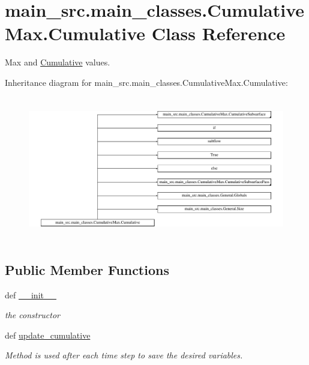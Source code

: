 \hypertarget{classmain__src_1_1main__classes_1_1CumulativeMax_1_1Cumulative}{\section{main\-\_\-src.\-main\-\_\-classes.\-Cumulative\-Max.\-Cumulative Class Reference}
\label{classmain__src_1_1main__classes_1_1CumulativeMax_1_1Cumulative}
}


Max and \hyperlink{classmain__src_1_1main__classes_1_1CumulativeMax_1_1Cumulative}{Cumulative} values.  


Inheritance diagram for main\-\_\-src.\-main\-\_\-classes.\-Cumulative\-Max.\-Cumulative\-:\begin{figure}[H]
\begin{center}
\leavevmode
\includegraphics[height=6.331658cm]{classmain__src_1_1main__classes_1_1CumulativeMax_1_1Cumulative}
\end{center}
\end{figure}
\subsection*{Public Member Functions}
\begin{DoxyCompactItemize}
\item 
def \hyperlink{classmain__src_1_1main__classes_1_1CumulativeMax_1_1Cumulative_a3d39ec1ab3bd33ad349b5268eaa0b571}{\-\_\-\-\_\-init\-\_\-\-\_\-}
\begin{DoxyCompactList}\small\item\em the constructor \end{DoxyCompactList}\item 
def \hyperlink{classmain__src_1_1main__classes_1_1CumulativeMax_1_1Cumulative_a23b050fd498633563a5920c0310166a4}{update\-\_\-cumulative}
\begin{DoxyCompactList}\small\item\em Method is used after each time step to save the desired variables. \end{DoxyCompactList}\end{DoxyCompactItemize}

